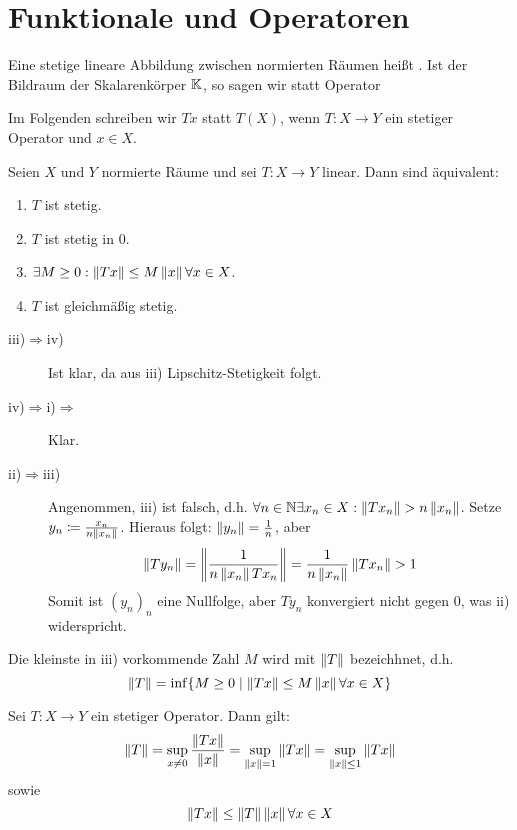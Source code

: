 \chapter{Funktionale und Operatoren}
\begin{definition}
	Eine stetige lineare Abbildung zwischen normierten R\"aumen hei\ss t . Ist der Bildraum der Skalarenk\"orper $ \mathbb{K} $, so sagen wir  statt Operator
\end{definition}
Im Folgenden schreiben wir $ Tx $ statt $ T(X) $, wenn $ T\colon X\rightarrow Y $ ein stetiger Operator und $ x\in X $.\\
\begin{satz}
	Seien $ X $ und $ Y $ normierte R\"aume und sei $ T\colon X\rightarrow Y $ linear. Dann sind \"aquivalent:
	\begin{enumerate}
		\item $ T $ ist stetig.
		\item $ T $ ist stetig in $ 0 $.
		\item $ \exists M\geq 0:\left\|Tx\right\|\leq M\left\|x\right\| \forall x\in X$.
		\item $ T $ ist gleichm\"a\ss ig stetig.
	\end{enumerate}
\end{satz}
\begin{beweis}
	\begin{description}
		\item[iii)$ \Rightarrow $iv)] Ist klar, da aus iii) Lipschitz-Stetigkeit folgt.
		\item[iv)$ \Rightarrow $i)$ \Rightarrow $] Klar.
		\item[ii)$ \Rightarrow $iii)] Angenommen, iii) ist falsch, d.h. $ \forall n\in\N\exists x_n\in X:\norm{Tx_n}>n\norm{x_n} $. Setze $ y_n\coloneqq \frac{x_n}{n\left\|x_n\right\|} $. Hieraus folgt: $ \left\|y_n\right\|=\frac{1}{n} $, aber \[ \norm{Ty_n}=\norm{\frac{1}{n\norm{x_n}Tx_n}}=\frac{1}{n\norm{x_n}}\norm{Tx_n}>1 \]
		Somit ist $ (y_n)_n $ eine Nullfolge, aber $ Ty_n $ konvergiert nicht gegen $ 0 $, was ii) widerspricht.
	\end{description}
\end{beweis}
\newpage
\begin{definition}
	Die kleinste in iii) vorkommende Zahl $ M $ wird mit $ \left\|T\right\| $ bezeichhnet, d.h.
	\[ \left\|T\right\|=\inf\lbrace M\geq 0\mid\left\|Tx\right\|\leq M\left\|x\right\|\forall x\in X\rbrace \]
\end{definition}
\begin{satz}
	Sei $ T\colon X\rightarrow Y $ ein stetiger Operator. Dann gilt:
	\[ \left\|T\right\|=\sup_{x\neq 0}\frac{\left\|Tx\right\|}{\left\|x\right\|}=\sup_{\left\|x\right\|=1}\left\|Tx\right\|=\sup_{\left\|x\right\|\leq 1}\left\|Tx\right\| \]
	sowie
	\[ \left\|Tx\right\|\leq\left\|T\right\|\left\|x\right\|\forall x\in X \]
\end{satz}
